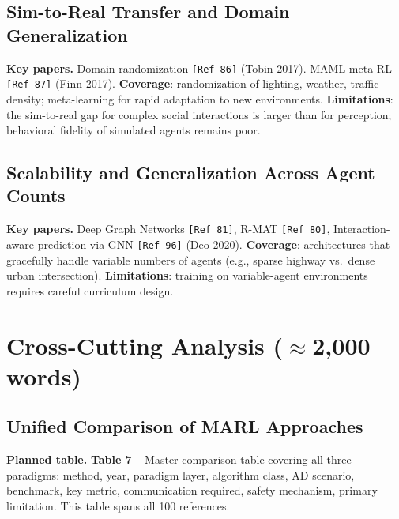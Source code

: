 \documentclass[12pt, a4paper]{article}
\begin{document}
\subsection{Sim-to-Real Transfer and Domain Generalization}

\begin{outline_note}
\textbf{Key papers.}
Domain randomization \texttt{[Ref\,86]} (Tobin 2017).
MAML meta-RL \texttt{[Ref\,87]} (Finn 2017).
\textbf{Coverage}: randomization of lighting, weather, traffic density;
meta-learning for rapid adaptation to new environments.
\textbf{Limitations}: the sim-to-real gap for complex social interactions
is larger than for perception; behavioral fidelity of simulated agents
remains poor.
\end{outline_note}

\subsection{Scalability and Generalization Across Agent Counts}

\begin{outline_note}
\textbf{Key papers.}
Deep Graph Networks \texttt{[Ref\,81]},
R-MAT \texttt{[Ref\,80]},
Interaction-aware prediction via GNN \texttt{[Ref\,96]} (Deo 2020).
\textbf{Coverage}: architectures that gracefully handle variable numbers
of agents (e.g., sparse highway vs.\ dense urban intersection).
\textbf{Limitations}: training on variable-agent environments requires
careful curriculum design.
\end{outline_note}

\section{Cross-Cutting Analysis \textnormal{\small ($\approx$2{,}000 words)}}
\label{sec:crosscut}

\subsection{Unified Comparison of MARL Approaches}

\begin{outline_note}
\textbf{Planned table.}
\textbf{Table 7} -- Master comparison table covering all three paradigms:
method, year, paradigm layer, algorithm class, AD scenario, benchmark,
key metric, communication required, safety mechanism, primary limitation.
This table spans all 100 references.
\end{outline_note}
\end{document}
